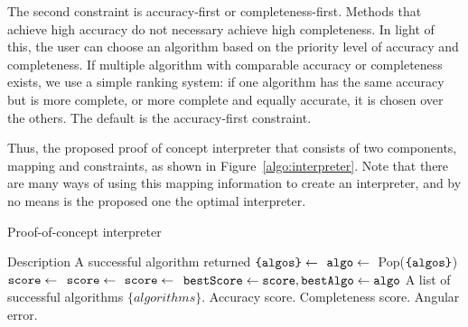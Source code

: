 The second constraint is accuracy-first or completeness-first. Methods that achieve high accuracy do not necessary achieve high completeness. In light of this, the user can choose an algorithm based on the priority level of accuracy and completeness. If multiple algorithm with comparable accuracy or completeness exists, we use a simple ranking system: if one algorithm has the same accuracy but is more complete, or more complete and equally accurate, it is chosen over the others. The default is the accuracy-first constraint.

Thus, the proposed proof of concept interpreter that consists of two components, mapping and constraints, as shown in Figure~\ref{algo:interpreter}. Note that there are many ways of using this mapping information to create an interpreter, and by no means is the proposed one the optimal interpreter.
\begin{algorithm}[!htbp]
\caption{Proof-of-concept interpreter}
\begin{algorithmic}
  \Require Description 
  \Ensure A successful algorithm  returned
  \State $\texttt{\{algos\}} \leftarrow{}$ 
    \State $\texttt{algo} \leftarrow{}$ Pop($\texttt{\{algos\}}$)
        \State $\texttt{score} \leftarrow{}$ 
        \State $\texttt{score} \leftarrow{}$ 
      \EndIf
      \State $\texttt{score} \leftarrow{}$ 
    \EndIf
      \State $\texttt{bestScore}\leftarrow{}\texttt{score}, \texttt{bestAlgo}\leftarrow{}\texttt{algo}$
    \EndIf
  \EndWhile
    \State\Return A list of successful algorithms $\{algorithms\}$.
  \EndFunction
      \State\Return Accuracy score.
      \State\Return Completeness score.
    \EndIf
    \State\Return Angular error.
  \EndFunction
\end{algorithmic}
\label{algo:interpreter}
\end{algorithm}


